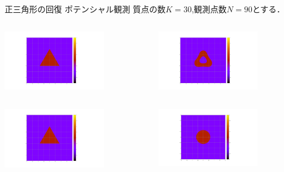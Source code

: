 \documentclass[dvipdfmx]{beamer}
\begin{document}
\begin{frame}{正三角形の回復 ポテンシャル観測}
  質点の数$K=30$,観測点数$N=90$とする．
  \begin{columns}
    \centering
    \begin{column}[b]{0.48\columnwidth}
      \centering
      \includegraphics[width=4.5cm]{fig/triangle.png}
    \end{column}
    \hspace{-3cm}
    \begin{column}[b]{0.48\columnwidth}
      \centering
      \includegraphics[width=4.5cm]{fig/PR6N90K30E4.png}
    \end{column}
  \end{columns}

  \begin{columns}
    \centering
    \begin{column}[b]{0.48\columnwidth}
      \centering
      \includegraphics[width=4.5cm]{fig/triangle.png}
    \end{column}
    \hspace{-3cm}
    \begin{column}[b]{0.48\columnwidth}
      \centering
      \includegraphics[width=4.5cm]{fig/PR60N90K30E4.png}
    \end{column}
  \end{columns}


\end{frame}
\end{document}
